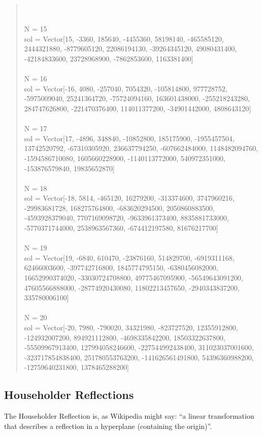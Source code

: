 \documentclass[letterpaper,12pt]{article}
\begin{document}
\begin{quote}
\\
\\N = 15
\\sol = Vector[15, -3360, 185640, -4455360, 58198140, -465585120, 2444321880, -8779605120, 22086194130, -39264345120, 49080431400, -42184833600, 23728968900, -7862853600, 1163381400]
\\
\\N = 16
\\sol = Vector[-16, 4080, -257040, 7054320, -105814800, 977728752, -5975009040, 25241364720, -75724094160, 163601438000, -255218243280, 284747626800, -221470376400, 114011377200, -34901442000, 4808643120]
\\
\\N = 17
\\sol = Vector[17, -4896, 348840, -10852800, 185175900, -1955457504, 13742520792, -67310305920, 236637794250, -607662484000, 1148482094760, -1594586710080, 1605660228900, -1140113772000, 540972351000, -153876579840, 19835652870]
\\
\\N = 18
\\sol = Vector[-18, 5814, -465120, 16279200, -313374600, 3747960216, -29983681728, 168275764800, -683620294500, 2050860883500, -4593928379040, 7707169098720, -9633961373400, 8835881733000, -5770371744000, 2538963567360, -674412197580, 81676217700]
\\
\\N = 19
\\sol = Vector[19, -6840, 610470, -23876160, 514829700, -6919311168, 62466003600, -397742716800, 1845774795150, -6380456082000, 16652990374020, -33030724708800, 49775467095900, -56549643091200, 47605566888000, -28774920430080, 11802213457650, -2940343837200, 335780006100]
\\
\\N = 20
\\sol = Vector[-20, 7980, -790020, 34321980, -823727520, 12355912800, -124932007200, 894921112800, -4698335842200, 18503322637800, -55509967913400, 127994058246600, -227544992438400, 311023037001600, -323717854838400, 251780553763200, -141626561491800, 54396360988200, -12759640231800, 1378465288200]
\end{quote}

\subsection{Householder Reflections}

The Householder Reflection is, as Wikipedia might say: ``a linear transformation
that describes a reflection in a hyperplane (containing the origin)''.
\end{document}
